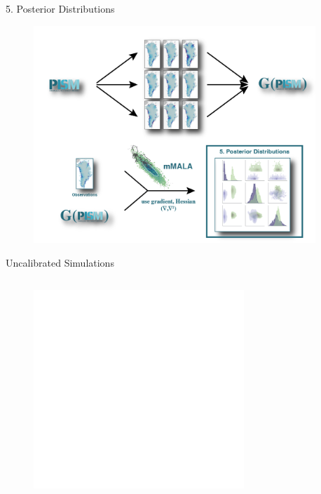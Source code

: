\documentclass[hide notes,intlimits]{beamer}
\begin{document}
\begin{frame}{5. Posterior Distributions}
  \vspace{-1.5em}
    \begin{minipage}[t][8.2cm][t]{\textwidth}
    \begin{figure}
      \includegraphics[height=8.2cm]{surrogate_model_5}
    \end{figure}
    \end{minipage}
\end{frame}

\begin{frame}{Uncalibrated Simulations}
\begin{columns}[c]
    \begin{column}{.5\textwidth}
      \begin{figure}
        \includegraphics<1>[height=7.5cm]{sle_pdf_w_obs_as19_2020.pdf}
    \end{figure}
    \end{column}
    \begin{column}{.5\textwidth}
    \end{column}
  \end{columns}

\end{frame}
\end{document}
